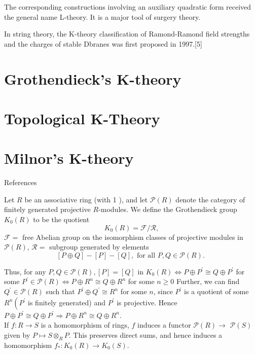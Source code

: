 The corresponding constructions involving an auxiliary quadratic form received the general name L-theory. It is a major tool of surgery theory.

In string theory, the K-theory classification of Ramond-Ramond field strengths and the charges of stable Dbranes was first proposed in 1997.[5]

\chapter{Grothendieck's K-theory}


\chapter{Topological K-Theory}


\chapter{Milnor's K-theory}
References \cite{srinivasAlgebraicKTheory1996}

Let $R$ be an associative ring (with 1 ), and let $\mathcal{P}(R)$ denote the category of finitely generated projective $R$-modules. We define the Grothendieck group $K_0(R)$ to be the quotient
$$
K_0(R)=\mathcal{F} / \mathcal{R},
$$
$\mathcal{F}=$ free Abelian group on the isomorphism classes of projective modules in $\mathcal{P}(R)$,
$\mathcal{R}=$ subgroup generated by elements
$$
[P \oplus Q]-[P]-[Q], \text { for all } P, Q \in \mathcal{P}(R) \text {. }
$$

Thus, for any $P, Q \in \mathcal{P}(R),[P]=[Q]$ in $K_0(R) \Longleftrightarrow P \oplus P^{\prime} \cong Q \oplus P^{\prime}$ for some $P^{\prime} \in \mathcal{P}(R) \Longleftrightarrow P \oplus R^n \cong Q \oplus R^n$ for some $n \geq 0$ Further, we can find $Q^{\prime} \in \mathcal{P}(R)$ such that $P^{\prime} \oplus Q^{\prime} \cong R^n$ for some $n$, since $P^{\prime}$ is a quotient of some $R^n\left(P^{\prime}\right.$ is finitely generated) and $P^{\prime}$ is projective. Hence $P \oplus P^{\prime} \cong Q \oplus P^{\prime} \Longrightarrow P \oplus R^n \cong Q \oplus R^n$.\\
If $f: R \rightarrow S$ is a homomorphism of rings, $f$ induces a functor $\mathcal{P}(R) \rightarrow$ $\mathcal{P}(S)$ given by $P \longmapsto S \otimes_R P$. This preserves direct sums, and hence induces a homomorphism $f_*: K_0(R) \rightarrow K_0(S)$.

